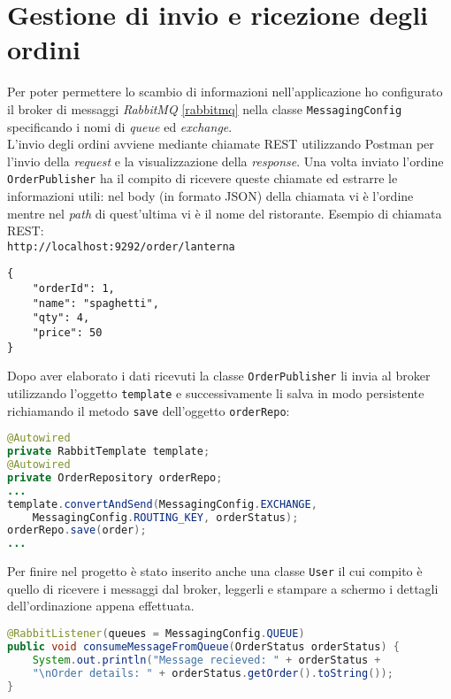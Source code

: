 \section{Gestione di invio e ricezione degli ordini}

Per poter permettere lo scambio di informazioni nell'applicazione ho configurato il broker di messaggi \textit{RabbitMQ} \ref{rabbitmq} nella classe \texttt{MessagingConfig} specificando i nomi di \textit{queue} ed \textit{exchange}.\\ L'invio degli ordini avviene mediante chiamate REST utilizzando Postman per l'invio della \textit{request} e la visualizzazione della \textit{response}. Una volta inviato l'ordine \texttt{OrderPublisher} ha il compito di ricevere queste chiamate ed estrarre le informazioni utili: nel body (in formato JSON) della chiamata vi è l'ordine mentre nel \textit{path} di quest'ultima vi è il nome del ristorante.
Esempio di chiamata REST:\\
\texttt{http://localhost:9292/order/lanterna}
\begin{lstlisting}[caption=Esempio contenuto del body,basicstyle=\footnotesize]
{
    "orderId": 1,
    "name": "spaghetti",
    "qty": 4,
    "price": 50
}
\end{lstlisting}
Dopo aver elaborato i dati ricevuti la classe \texttt{OrderPublisher} li invia al broker utilizzando l'oggetto \texttt{template} e successivamente li salva in modo persistente richiamando il metodo \texttt{save} dell'oggetto \texttt{orderRepo}:
\begin{lstlisting}[language=Java, caption=Frammento del codice della classe \texttt{OrderPublisher} e relativo metodo \texttt{bookOrder}, basicstyle=\footnotesize]
@Autowired
private RabbitTemplate template;
@Autowired
private OrderRepository orderRepo;
...
template.convertAndSend(MessagingConfig.EXCHANGE,
    MessagingConfig.ROUTING_KEY, orderStatus);
orderRepo.save(order);
...
\end{lstlisting}
Per finire nel progetto è stato inserito anche una classe \texttt{User} il cui compito è quello di ricevere i messaggi dal broker, leggerli e stampare a schermo i dettagli dell'ordinazione appena effettuata.
\begin{lstlisting}[language=Java, caption=Frammento del codice della classe \texttt{User}, basicstyle=\footnotesize]
@RabbitListener(queues = MessagingConfig.QUEUE)
public void consumeMessageFromQueue(OrderStatus orderStatus) {
    System.out.println("Message recieved: " + orderStatus +
    "\nOrder details: " + orderStatus.getOrder().toString());
}
\end{lstlisting}